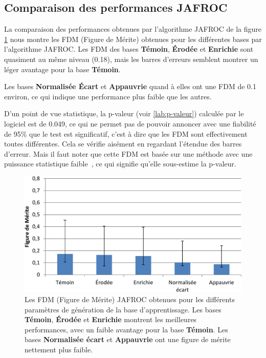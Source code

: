 \subsection{Comparaison des performances JAFROC}

La comparaison des performances obtenues par l'algorithme JAFROC \cite{chakraborty1990free} de la figure \ref{lab:fom_param} nous montre les FDM (Figure de Mérite) obtenues pour les différentes bases par l'algorithme JAFROC. Les FDM des bases \textbf{Témoin}, \textbf{Érodée} et \textbf{Enrichie} sont quasiment au même niveau (0.18), mais les barres d'erreurs semblent montrer un léger avantage pour la base \textbf{Témoin}.

Les bases \textbf{Normalisée Écart} et \textbf{Appauvrie} quand à elles ont une FDM de 0.1 environ, ce qui indique une performance plus faible que les autres.

D'un point de vue statistique, la p-valeur (voir \ref{lab:p-valeur}) calculée par le logiciel est de 0.049, ce qui ne permet pas de pouvoir annoncer avec une fiabilité de 95\% que le test est significatif, c'est à dire que les FDM sont effectivement toutes différentes. Cela se vérifie aisément en regardant l'étendue des barres d'erreur. Mais il faut noter que cette FDM est basée sur une méthode avec une puissance statistique faible~\cite{chakraborty2004observer}, ce qui signifie qu'elle sous-estime la p-valeur.

\begin{figure}[h!]
 \begin{center}
   \includegraphics[width=15cm]{images/FOM_param}
 \end{center}
 \caption{Les FDM (Figure de Mérite) JAFROC obtenues pour les différents paramètres de génération de la base d'apprentissage. Les bases \textbf{Témoin}, \textbf{\'Erodée} et \textbf{Enrichie} montrent les meilleures performances, avec un faible avantage pour la base \textbf{Témoin}. Les bases \textbf{Normalisée écart} et \textbf{Appauvrie} ont une figure de mérite nettement plus faible.}
 \label{lab:fom_param}
\end{figure}

